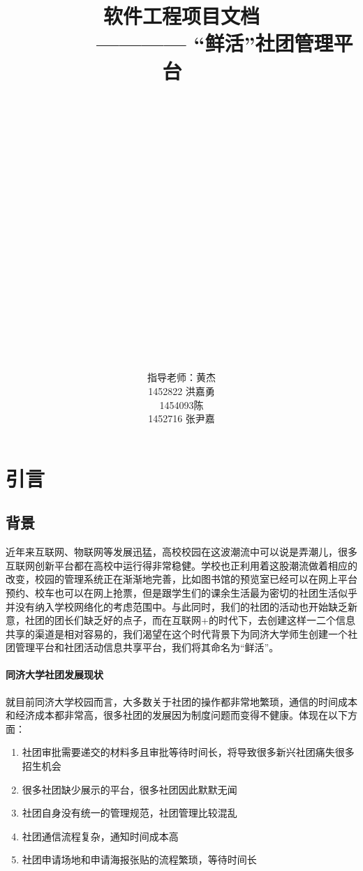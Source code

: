 \documentclass[UTF8]{ctexart}
\title{\Huge \textbf{软件工程项目文档}  \\
\large ~~~~~~~ ———— “鲜活”社团管理平台
 ~\\ ~\\ ~\\ ~\\ ~\\ ~\\ ~\\ ~\\ ~\\ ~\\ ~\\}
\author{
\large 指导老师：黄杰 \\
\large 1452822 洪嘉勇 \\
\large 1454093陈   \\
\large 1452716 张尹嘉 \\
}
\begin{document}
\maketitle




\newpage
\tableofcontents
\newpage

\section{引言}
\subsection{背景}
近年来互联网、物联网等发展迅猛，高校校园在这波潮流中可以说是弄潮儿，很多互联网创新平台都在高校中运行得非常稳健。学校也正利用着这股潮流做着相应的改变，校园的管理系统正在渐渐地完善，比如图书馆的预览室已经可以在网上平台预约、校车也可以在网上抢票，但是跟学生们的课余生活最为密切的社团生活似乎并没有纳入学校网络化的考虑范围中。与此同时，我们的社团的活动也开始缺乏新意，社团的团长们缺乏好的点子，而在互联网+的时代下，去创建这样一二个信息共享的渠道是相对容易的，我们渴望在这个时代背景下为同济大学师生创建一个社团管理平台和社团活动信息共享平台，我们将其命名为“鲜活”。
\paragraph{同济大学社团发展现状}
就目前同济大学校园而言，大多数关于社团的操作都非常地繁琐，通信的时间成本和经济成本都非常高，很多社团的发展因为制度问题而变得不健康。体现在以下方面：

\begin{enumerate}[1)]
\item 社团审批需要递交的材料多且审批等待时间长，将导致很多新兴社团痛失很多招生机会
\item 很多社团缺少展示的平台，很多社团因此默默无闻
\item 社团自身没有统一的管理规范，社团管理比较混乱
\item 社团通信流程复杂，通知时间成本高
\item 社团申请场地和申请海报张贴的流程繁琐，等待时间长
\end{enumerate}
\end{document}
